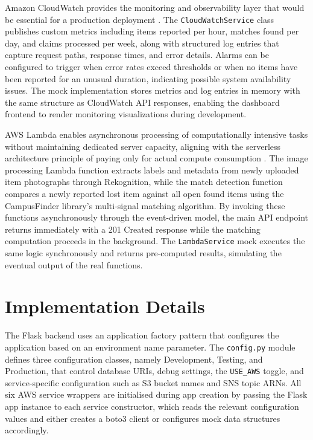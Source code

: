\documentclass[conference]{IEEEtran}
\begin{document}
Amazon CloudWatch provides the monitoring and observability layer that would be essential for a production deployment \cite{cloudwatch}. The \texttt{CloudWatchService} class publishes custom metrics including items reported per hour, matches found per day, and claims processed per week, along with structured log entries that capture request paths, response times, and error details. Alarms can be configured to trigger when error rates exceed thresholds or when no items have been reported for an unusual duration, indicating possible system availability issues. The mock implementation stores metrics and log entries in memory with the same structure as CloudWatch API responses, enabling the dashboard frontend to render monitoring visualizations during development.

AWS Lambda enables asynchronous processing of computationally intensive tasks without maintaining dedicated server capacity, aligning with the serverless architecture principle of paying only for actual compute consumption \cite{cloudnative}. The image processing Lambda function extracts labels and metadata from newly uploaded item photographs through Rekognition, while the match detection function compares a newly reported lost item against all open found items using the CampusFinder library's multi-signal matching algorithm. By invoking these functions asynchronously through the event-driven model, the main API endpoint returns immediately with a 201 Created response while the matching computation proceeds in the background. The \texttt{LambdaService} mock executes the same logic synchronously and returns pre-computed results, simulating the eventual output of the real functions.

\section{Implementation Details}

The Flask backend uses an application factory pattern that configures the application based on an environment name parameter. The \texttt{config.py} module defines three configuration classes, namely Development, Testing, and Production, that control database URIs, debug settings, the \texttt{USE\_AWS} toggle, and service-specific configuration such as S3 bucket names and SNS topic ARNs. All six AWS service wrappers are initialised during app creation by passing the Flask app instance to each service constructor, which reads the relevant configuration values and either creates a boto3 client or configures mock data structures accordingly.
\end{document}

